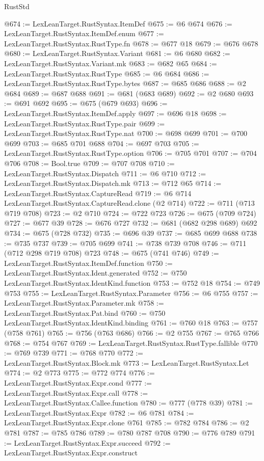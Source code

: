 \begin{lexlean}{RustStd}
\begin{coremodule}
@674 := LexLeanTarget.RustSyntax.ItemDef
@675 := @6 @674
@676 := LexLeanTarget.RustSyntax.ItemDef.enum
@677 := LexLeanTarget.RustSyntax.RustType.fn
@678 := @677 @18
@679 := @676 @678
@680 := LexLeanTarget.RustSyntax.Variant
@681 := @6 @680
@682 := LexLeanTarget.RustSyntax.Variant.mk
@683 := @682 @65
@684 := LexLeanTarget.RustSyntax.RustType
@685 := @6 @684
@686 := LexLeanTarget.RustSyntax.RustType.bytes
@687 := @685 @686
@688 := @2 @684
@689 := @687 @688
@691 := @681 (@683 @689)
@692 := @2 @680
@693 := @691 @692
@695 := @675 (@679 @693)
@696 := LexLeanTarget.RustSyntax.ItemDef.apply
@697 := @696 @18
@698 := LexLeanTarget.RustSyntax.RustType.pair
@699 := LexLeanTarget.RustSyntax.RustType.nat
@700 := @698 @699
@701 := @700 @699
@703 := @685 @701 @688
@704 := @697 @703
@705 := LexLeanTarget.RustSyntax.RustType.option
@706 := @705 @701
@707 := @704 @706
@708 := Bool.true
@709 := @707 @708
@710 := LexLeanTarget.RustSyntax.Dispatch
@711 := @6 @710
@712 := LexLeanTarget.RustSyntax.Dispatch.mk
@713 := @712 @65
@714 := LexLeanTarget.RustSyntax.CaptureRead
@719 := @6 @714 LexLeanTarget.RustSyntax.CaptureRead.clone (@2 @714)
@722 := @711 (@713 @719 @708)
@723 := @2 @710
@724 := @722 @723
@726 := @675 (@709 @724)
@727 := @677 @39
@728 := @676 @727
@732 := @681 (@682 @298 @689) @692
@734 := @675 (@728 @732)
@735 := @696 @39
@737 := @685 @699 @688
@738 := @735 @737
@739 := @705 @699
@741 := @738 @739 @708
@746 := @711 (@712 @298 @719 @708) @723
@748 := @675 (@741 @746)
@749 := LexLeanTarget.RustSyntax.ItemDef.function
@750 := LexLeanTarget.RustSyntax.Ident.generated
@752 := @750 LexLeanTarget.RustSyntax.IdentKind.function
@753 := @752 @18
@754 := @749 @753
@755 := LexLeanTarget.RustSyntax.Parameter
@756 := @6 @755
@757 := LexLeanTarget.RustSyntax.Parameter.mk
@758 := LexLeanTarget.RustSyntax.Pat.bind
@760 := @750 LexLeanTarget.RustSyntax.IdentKind.binding
@761 := @760 @18
@763 := @757 (@758 @761)
@765 := @756 (@763 @686)
@766 := @2 @755
@767 := @765 @766
@768 := @754 @767
@769 := LexLeanTarget.RustSyntax.RustType.fallible
@770 := @769 @739
@771 := @768 @770
@772 := LexLeanTarget.RustSyntax.Block.mk
@773 := LexLeanTarget.RustSyntax.Let
@774 := @2 @773
@775 := @772 @774
@776 := LexLeanTarget.RustSyntax.Expr.cond
@777 := LexLeanTarget.RustSyntax.Expr.call
@778 := LexLeanTarget.RustSyntax.Callee.function
@780 := @777 (@778 @39)
@781 := LexLeanTarget.RustSyntax.Expr
@782 := @6 @781
@784 := LexLeanTarget.RustSyntax.Expr.clone @761
@785 := @782 @784
@786 := @2 @781
@787 := @785 @786
@789 := @780 @787 @708
@790 := @776 @789
@791 := LexLeanTarget.RustSyntax.Expr.succeed
@792 := LexLeanTarget.RustSyntax.Expr.construct

\end{coremodule}
\end{lexlean}
